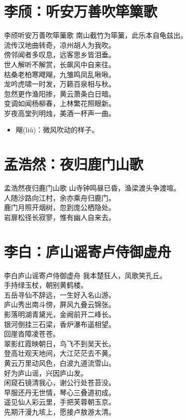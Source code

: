 \documentclass[12pt,oneside,a5paper]{book}
\begin{document}
\chapter{李颀：听安万善吹筚篥歌}
\begin{poemzh}{李颀}{听安万善吹筚篥歌}
南山截竹为筚篥，此乐本自龟兹出。\\
流传汉地曲转奇，凉州胡人为我吹。\\
傍邻闻者多叹息，远客思乡皆泪垂。\\
世人解听不解赏，长飙风中自来往。\\
枯桑老柏寒飕飗，九雏鸣凤乱啾啾。\\
龙吟虎啸一时发，万籁百泉相与秋。\\
忽然更作渔阳掺，黄云萧条白日暗。\\
变调如闻杨柳春，上林繁花照眼新。\\
岁夜高堂列明烛，美酒一杯声一曲。\\ 
\end{poemzh}

\begin{itemize}
\item 飗(liú)：微风吹动的样子。
\end{itemize}

\chapter{孟浩然：夜归鹿门山歌}
\begin{poemzh}{孟浩然}{夜归鹿门山歌}
山寺钟鸣昼已昏，渔梁渡头争渡喧。\\
人随沙路向江村，余亦乘舟归鹿门。\\
鹿门月照开烟树，忽到庞公栖隐处。\\
岩扉松径长寂寥，惟有幽人自来去。\\ 
\end{poemzh}

\chapter{李白：庐山谣寄卢侍御虚舟}
\begin{poemzh}{李白}{庐山谣寄卢侍御虚舟}
我本楚狂人，凤歌笑孔丘。\\
手持绿玉杖，朝别黄鹤楼。\\
五岳寻仙不辞远，一生好入名山游。\\
庐山秀出南斗傍，屏风九叠云锦张。\\
影落明湖青黛光，金阙前开二峰长。\\
银河倒挂三石梁，香炉瀑布遥相望。\\
回崖沓障凌苍苍。\\
翠影红霞映朝日，鸟飞不到吴天长。\\
登高壮观天地间，大江茫茫去不黄。\\
黄云万里动风色，白波九道流雪山。\\
好为庐山谣，兴因庐山发。\\
闲窥石镜清我心，谢公行处苍苔没。\\
早服还丹无世情，琴心三叠道初成。\\
遥见仙人彩云里，手把芙蓉朝玉京。\\
先期汗漫九垓上，愿接卢敖游太清。\\ 
\end{poemzh}
\end{document}
